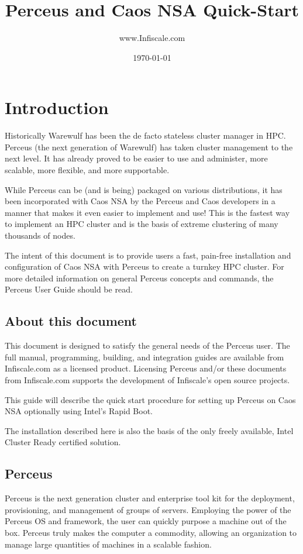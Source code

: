 \documentclass[10pt,letterpaper]{article}
\title{Perceus and Caos NSA Quick-Start}
\author{www.Infiscale.com}
\date{\today}
\begin{document}
\maketitle

\addtolength{\parskip}{0.5\baselineskip}

\section{Introduction}
Historically Warewulf has been the de facto stateless cluster manager in
HPC. Perceus (the next generation of Warewulf) has taken cluster management
to the next level. It has already proved to be easier to use and administer,
more scalable, more flexible, and more supportable.

While Perceus can be (and is being) packaged on various distributions, it has
been incorporated with Caos NSA by the Perceus and Caos developers in a manner
that makes it even easier to implement and use!  This is the fastest way to
implement an HPC cluster and is the basis of extreme clustering of many
thousands of nodes.

The intent of this document is to provide users a fast, pain-free installation
and configuration of Caos NSA with Perceus to create a turnkey HPC cluster. For
more detailed information on general Perceus concepts and commands, the Perceus
User Guide should be read.

\subsection{About this document}
This document is designed to satisfy the general needs of the Perceus user.
The full manual, programming, building, and integration guides are available
from Infiscale.com as a licensed product. Licensing Perceus and/or these
documents from Infiscale.com supports the development of Infiscale's open
source projects.

This guide will describe the quick start procedure for setting up Perceus
on Caos NSA optionally using Intel's Rapid Boot.

The installation described here is also the basis of the only freely
available, Intel Cluster Ready certified solution.

\subsection{Perceus}
Perceus is the next generation cluster and enterprise tool kit for the
deployment, provisioning, and management of groups of servers. Employing the
power of the Perceus OS and framework, the user can quickly purpose a machine
out of the box. Perceus truly makes the computer a commodity, allowing an
organization to manage large quantities of machines in a scalable fashion.
\end{document}
